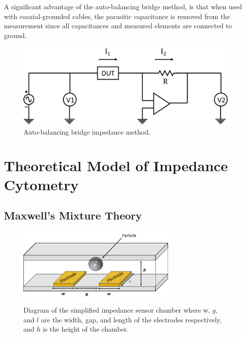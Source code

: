 A significant advantage of the auto-balancing bridge method, is that when used with coaxial-grounded cables, the parasitic capacitance is removed from the measurement since all capacitances and measured elements are connected to ground. 
\clearpage

 \begin{figure}[ht]
    \centering
    \includegraphics[width=\textwidth]{images/autoBalancingBridge.png}
    \caption[Auto-balancing bridge impedance method.]{Auto-balancing bridge impedance method.}
    \label{fig:auto-balancing_bridge}
\end{figure}
 
 
 \section[Model of Cell Suspension Impedance]{Theoretical Model of Impedance Cytometry}
 \label{sec:theory_impedance_cytometry}

\subsection{Maxwell's Mixture Theory}
\label{sec:maxwell_mixture_theory}
 \begin{figure}[ht]
 \centering
 \includegraphics[width=0.7\textwidth]{images/cellAndElectrodes.png}
 \caption[Schematic diagram of simplified impedance sensor chamber.]{Diagram of the simplified impedance sensor chamber where w, $g$, and $l$ are the width, gap, and length of the electrodes respectively, and $h$ is the height of the chamber.}
 \label{fig:simplified_IS}
 \end{figure}
 
